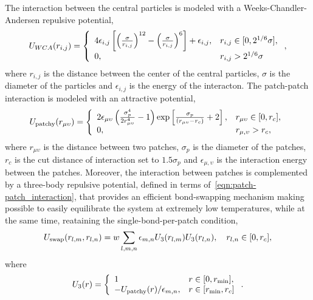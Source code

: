 The interaction between the central particles is modeled with a Weeks-Chandler-Andersen repulsive potential,
\begin{gather}
    U_{WCA}(r_{i,j}) =\left\{ 
        \begin{array}{ll}
            4\epsilon_{i,j}\left[\qty(\frac{\sigma}{r_{i,j}})^{12}-\qty(\frac{\sigma}{r_{i,j}})^6\right]+\epsilon_{i,j}, & r_{i,j}\in[0,2^{1/6}\sigma], \\
            0, & r_{i,j}>2^{1/6}\sigma
        \end{array}
\right.
    ,\label{eqn:CL-MO_interaction}
\end{gather}
where $r_{i,j}$ is the distance between the center of the central particles, $\sigma$ is the diameter of the particles and $\epsilon_{i,j}$ is the energy of the interacton.
The patch-patch interaction is modeled with an attractive potential,
\begin{gather}
    U_{\mathrm{patchy}}\qty(r_{\mu\upsilon}) = \left\{
        \begin{array}{ll}
            2\epsilon_{\mu\upsilon}\left(\frac{\sigma_p^4}{2 r_{\mu\upsilon}^4}-1\right)\exp\left[\frac{\sigma_p}{\qty(r_{\mu\upsilon}-r_{c})}+2\right], & r_{\mu\upsilon}\in\qty[0,r_c], \\
            0, & r_{\mu,\upsilon}>r_c,
        \end{array}
            \right.\label{eqn:patch-patch_interaction}
\end{gather}
where $r_{\mu\upsilon}$ is the distance between two patches, $\sigma_p$ is the diameter of the patches, $r_c$ is the cut distance of interaction set to $1.5\sigma_p$ and $\epsilon_{\mu,\upsilon}$ is the interaction energy between the patches.
Moreover, the interaction between patches is complemented by a three-body repulsive potential, defined in terms of~\eqref{eqn:patch-patch_interaction}, that provides an efficient bond-swapping mechanism making possible to easily equilibrate the system at extremely low temperatures, while at the same time, reataining the single-bond-per-patch condition\citep{sciortinoThreebodyPotentialSimulating2017},
\begin{gather}
    U_{\mathrm{swap}}(r_{l,m},r_{l,n}) = w\sum_{l,m,n}\epsilon_{m,n}U_3\qty(r_{l,m})U_3\qty(r_{l,n}),\quad r_{l,n}\in\qty[0,r_c],\label{eqn:swap_interaction}
\end{gather}
where
\begin{gather}
    U_{3}\qty(r) = \left\{
        \begin{array}{ll}
            1 & r\in\qty[0,r_{\min}], \\
            -U_{\mathrm{patchy}}\qty(r)/\epsilon_{m,n}, & r\in\qty[r_{\min},r_c]
        \end{array}
        \right.\label{eqn:swapmod_interaction}.
\end{gather}
